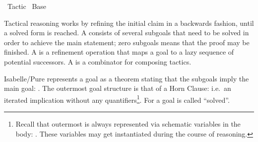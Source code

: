 %
\begin{isabellebody}%
\def\isabellecontext{Tactic}%
%
\isadelimtheory
%
\endisadelimtheory
%
\isatagtheory
{}\isamarkupfalse%
\ Tactic\isanewline
{}\ Base\isanewline
{}%
\endisatagtheory
{\isafoldtheory}%
%
\isadelimtheory
%
\endisadelimtheory
%
\isamarkuptrue%
%
\begin{isamarkuptext}%
Tactical reasoning works by refining the initial claim in a
  backwards fashion, until a solved form is reached.  A 
  consists of several subgoals that need to be solved in order to
  achieve the main statement; zero subgoals means that the proof may
  be finished.  A  is a refinement operation that maps
  a goal to a lazy sequence of potential successors.  A  is a combinator for composing tactics.%
\end{isamarkuptext}%
\isamarkuptrue%
%
\isamarkuptrue%
%
\begin{isamarkuptext}%
Isabelle/Pure represents a goal as a theorem stating that the subgoals imply the main
  goal: .  The outermost goal
  structure is that of a Horn Clause: i.e.\ an iterated implication without any
  quantifiers\footnote{Recall that outermost  is
  always represented via schematic variables in the body: .  These variables may get instantiated during the course of
  reasoning.}.  For  a goal is called ``solved''.


\end{isamarkuptext}
\end{isabellebody}
